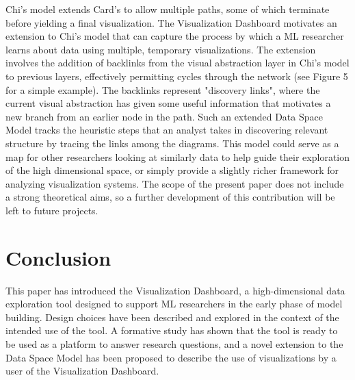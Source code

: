 \documentclass{sigchi}
\begin{document}
%
Chi's model extends Card's to allow multiple paths, some of which terminate before yielding a final visualization. %
%
The Visualization Dashboard motivates an extension to Chi's model that can capture the process by which a ML researcher learns about data using multiple, temporary visualizations. %
%
The extension involves the addition of backlinks from the visual abstraction layer in Chi's model to previous layers, effectively permitting cycles through the network (see Figure 5 for a simple example). %
%
The backlinks represent "discovery links", where the current visual abstraction has given some useful information that motivates a new branch from an earlier node in the path.
%
Such an extended Data Space Model tracks the heuristic steps that an analyst takes in discovering relevant structure by tracing the links among the diagrams. %
%
This model could serve as a map for other researchers looking at similarly data to help guide their exploration of the high dimensional space, or simply provide a slightly richer framework for analyzing visualization systems. %
%
The scope of the present paper does not include a strong theoretical aims, so a further development of this contribution will be left to future projects. %
%
%
%
\section{Conclusion}%
%
%
%
This paper has introduced the Visualization Dashboard, a high-dimensional data exploration tool designed to support ML researchers in the early phase of model building. Design choices have been described and explored in the context of the intended use of the tool. A formative study has shown that the tool is ready to be used as a platform to answer research questions, and a novel extension to the Data Space Model has been proposed to describe the use of visualizations by a user of the Visualization Dashboard.
%



\end{document}
